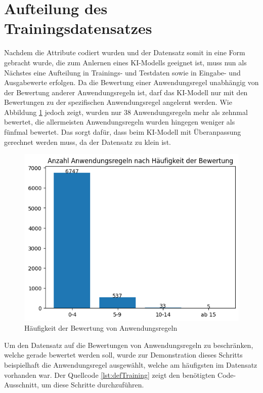 \section{Aufteilung des Trainingsdatensatzes}
\label{chap:Trainingssplit}
Nachdem die Attribute codiert wurden und der Datensatz somit in eine Form gebracht wurde, die zum Anlernen eines \ac{KI}-Modells geeignet ist, 
muss nun als Nächstes eine Aufteilung in Trainings- und Testdaten sowie in Eingabe- und Ausgabewerte erfolgen. Da die Bewertung einer Anwendungsregel
unabhängig von der Bewertung anderer Anwendungsregeln ist, darf das \ac{KI}-Modell nur mit den Bewertungen zu der spezifischen Anwendungsregel angelernt werden.
Wie Abbildung \ref*{fig:ARMenge} jedoch zeigt, wurden nur 38 Anwendungsregeln mehr als zehnmal bewertet, die allermeisten Anwendungsregeln wurden hingegen weniger als 
fünfmal bewertet. Das sorgt dafür, dass beim \ac{KI}-Modell mit Überanpassung gerechnet werden muss, da der Datensatz zu klein ist.
\begin{figure}[H]
    \centering
    \includegraphics[width = \textwidth]{abbildungen/BalkenAR.png}
    \caption{Häufigkeit der Bewertung von Anwendungsregeln}
    \label{fig:ARMenge}
\end{figure}

Um den Datensatz auf die Bewertungen von Anwendungsregeln zu beschränken, welche gerade bewertet werden soll, wurde zur Demonstration dieses Schritts 
beispielhaft die Anwendungsregel ausgewählt, welche am häufigsten im Datensatz vorhanden war. Der Quellcode \ref*{lst:defTraining} zeigt den benötigten Code-Ausschnitt,
um diese Schritte durchzuführen.

